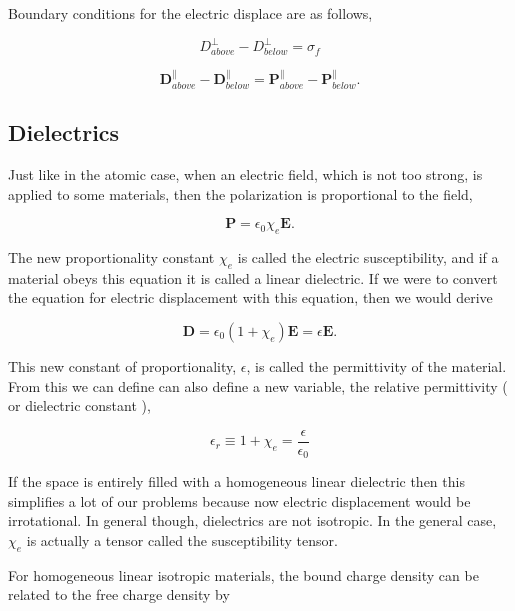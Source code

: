 \documentclass[preprint, review,12pt]{elsarticle}
\def\b{\textbf}
\def\={\equiv}
\begin{document}
Boundary conditions for the electric displace are as follows,

\begin{equation}
    D_{above}^\bot - D_{below}^\bot = \sigma_f
\end{equation}

\begin{equation}
    \b{D}_{above}^\parallel - \b{D}_{below}^\parallel = \b{P}_{above}^\parallel - \b{P}_{below}^\parallel.
\end{equation}

\subsection{Dielectrics}

Just like in the atomic case, when an electric field, which is not too strong, is applied to some materials, then the polarization is proportional to the field,

\begin{equation}
    \b{P} = \epsilon_0 \chi_e \b{E}.
\end{equation}

The new proportionality constant $\chi_e$ is called the electric susceptibility, and if a material obeys this equation it is called a linear dielectric. If we were to convert the equation for electric displacement with this equation, then we would derive 

\begin{equation}
    \b{D} = \epsilon_0 (1+\chi_e)\b{E} = \epsilon \b{E}.
\end{equation}

This new constant of proportionality, $\epsilon$, is called the permittivity of the material. From this we can define can also define a new variable, the relative permittivity ( or dielectric constant ), 

\begin{equation}
    \epsilon_r \= 1 + \chi_e = \frac{\epsilon}{\epsilon_0}
\end{equation}

If the space is entirely filled with a homogeneous linear dielectric then this simplifies a lot of our problems because now electric displacement would be irrotational. In general though, dielectrics are not isotropic. In the general case, $\chi_e$ is actually a tensor called the susceptibility tensor. 

For homogeneous linear isotropic materials, the bound charge density can be related to the free charge density by
\end{document}
